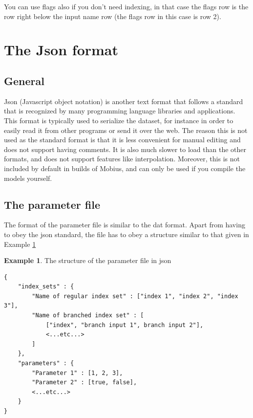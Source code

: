 \documentclass[11pt]{article}
\theoremstyle{definition}
\newtheorem{myexample}{Example}
\newenvironment{example}%
  {\begin{lrbox}{\examplebox}%
   \begin{minipage}{\dimexpr\linewidth-2\fboxsep}
   \begin{myexample}}%
  {\end{myexample}%
   \end{minipage}%
   \end{lrbox}%
   \begin{trivlist}
     \item[]\colorbox{silver}{\usebox\examplebox}
   \end{trivlist}}
\begin{document}
You can use flags also if you don't need indexing, in that case the flags row is the row right below the input name row (the flags row in this case is row 2).

\section{The Json format}

\subsection{General}

Json (Javascript object notation)  is another text format that follows a standard that is recognized by many programming language libraries and applications. This format is typically used to serialize the dataset, for instance in order to easily read it from other programs or send it over the web. The reason this is not used as the standard format is that it is less convenient for manual editing and does not support having comments. It is also much slower to load than the other formats, and does not support features like interpolation. Moreover, this is not included by default in builds of Mobius, and can only be used if you compile the models yourself.

\subsection{The parameter file}
The format of the parameter file is similar to the dat format. Apart from having to obey the json standard, the file has to obey a structure similar to that given in Example \ref{ex:jsonpar}

\begin{example}\label{ex:jsonpar}
The structure of the parameter file in json
\begin{lstlisting}
{
	"index_sets" : {
		"Name of regular index set" : ["index 1", "index 2", "index 3"],
		"Name of branched index set" : [
			["index", "branch input 1", branch input 2"],
			<...etc...>
		]
	},
	"parameters" : {
		"Parameter 1" : [1, 2, 3],
		"Parameter 2" : [true, false],
		<...etc...>
	}
}
\end{lstlisting}
\end{example}
\end{document}
